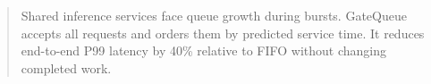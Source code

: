 \begin{abstract}
Shared inference services face queue growth during bursts. GateQueue accepts
all requests and orders them by predicted service time. It reduces end-to-end
P99 latency by 40\% relative to FIFO without changing completed work.
\end{abstract}
